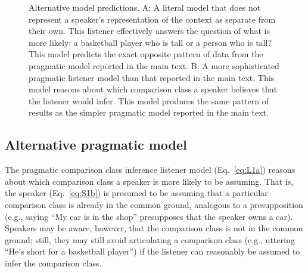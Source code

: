 \documentclass[doc]{apa6}
\begin{document}
\begin{figure}[t]
    \centering
    \caption{Alternative model predictions. A: A literal model that does not represent a speaker's representation of the context as separate from their own. This listener effectively answers the question of what is more likely: a basketball player who is tall or a person who is tall? This model predicts the exact opposite pattern of data from the pragmatic model reported in the main text. B: A more sophisticated pragmatic listener model than that reported in the main text. This model reasons about which comparison class a speaker believes that the listener would infer. This model produces the same pattern of results as the simpler pragmatic model reported in the main text.}
    \label{fig:altModels}
\end{figure}


\subsection{Alternative pragmatic model}

The pragmatic comparison class inference listener model (Eq.~\ref{eq:L1a}) reasons about which comparison class a speaker is more likely to be assuming.
That is, the speaker (Eq.~\ref{eq:S1b}) is presumed to be assuming that a particular comparison class is already in the common ground, analogous to a presupposition (e.g., saying ``My car is in the shop'' presupposes that the speaker owns a car). 
Speakers may be aware, however, that the comparison class is not in the common ground; still, they may still avoid articulating a comparison class  (e.g., uttering ``He's short for a basketball player'') if the listener can reasonably be assumed to infer the comparison class. 
\end{document}
